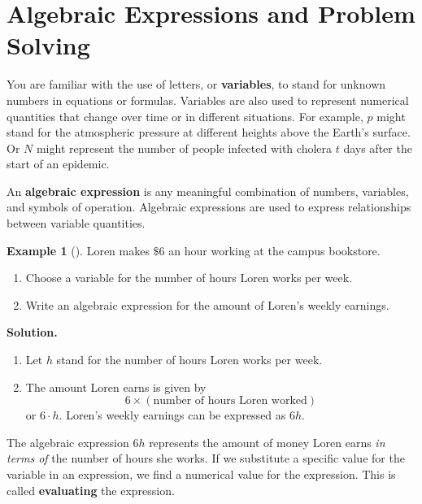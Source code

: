\documentclass[10pt,]{book}
\newcommand{\terminology}[1]{\textbf{#1}}
\theoremstyle{plain}
\theoremstyle{definition}
\theoremstyle{definition}
\newtheorem{example}[theorem]{Example}
\theoremstyle{definition}
\numberwithin{equation}{part}
\begin{document}
\section[{Algebraic Expressions and Problem Solving}]{Algebraic Expressions and Problem Solving}\label{appendix-Algebraic-Expressions-and-Problem-Solving}
You are familiar with the use of letters, or \terminology{variables}, to stand for unknown numbers in equations or formulas. Variables are also used to represent numerical quantities that change over time or in different situations. For example, \(p\) might stand for the atmospheric pressure at different heights above the Earth's surface. Or \(N\) might represent the number of people infected with cholera \(t\) days after the start of an epidemic.%
\par
An \terminology{algebraic expression} is any meaningful combination of numbers, variables, and symbols of operation. Algebraic expressions are used to express relationships between variable quantities.%
\begin{example}[]\label{example-Loren}
Loren makes \(\$6\) an hour working at the campus bookstore. \leavevmode%
\begin{enumerate}[label=*\alph**]
\item\hypertarget{li-127}{}Choose a variable for the number of hours Loren works per week.%
\item\hypertarget{li-128}{}Write an algebraic expression for the amount of Loren's weekly earnings.%
\end{enumerate}
%
\par\medskip\noindent%
\textbf{Solution.}\quad \leavevmode%
\begin{enumerate}[label=*\alph**]
\item\hypertarget{li-129}{}Let \(h\) stand for the number of hours Loren works per week.%
\item\hypertarget{li-130}{}The amount Loren earns is given by%
\begin{equation*}
6\times (\text{number of hours Loren worked})
\end{equation*}
or \(6\cdot h\). Loren's weekly earnings can be expressed as \(6h\).%
\end{enumerate}
%
\end{example}
\par
The algebraic expression \(6h\) represents the amount of money Loren earns \emph{in terms of} the number of hours she works. If we substitute a specific value for the variable in an expression, we find a numerical value for the expression. This is called \terminology{evaluating} the expression.%
\end{document}
